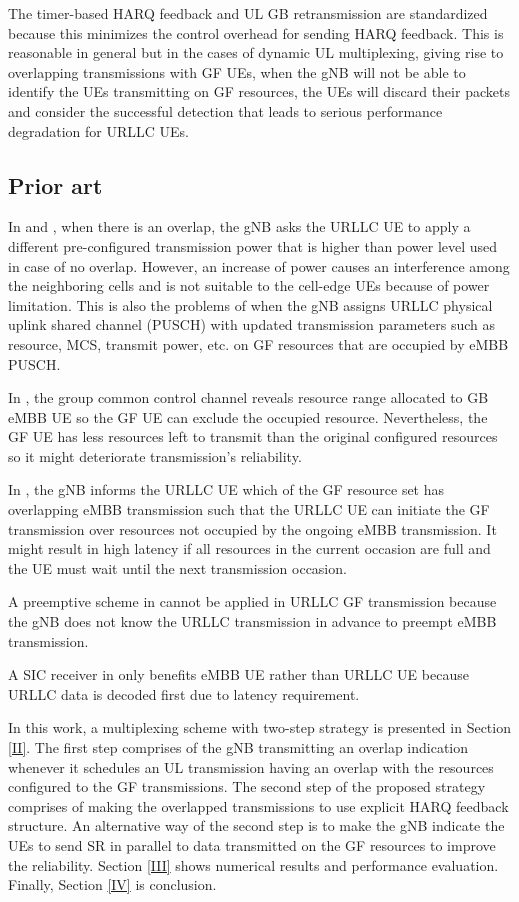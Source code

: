 \documentclass[conference]{IEEEtran}
\begin{document}
The timer-based HARQ feedback and UL GB retransmission are standardized because this minimizes the control overhead for sending HARQ feedback. This is reasonable in general but in the cases of dynamic UL multiplexing, giving rise to overlapping transmissions with GF UEs, when the gNB will not be able to identify the UEs transmitting on GF resources, the UEs will discard their packets and consider the successful detection that leads to serious performance degradation for URLLC UEs.

\subsection{Prior art}\label{ICC}
In \cite{b2} and \cite{b3}, when there is an overlap, the gNB asks the URLLC UE to apply a different pre-configured transmission power that is higher than power level used in case of no overlap. However, an increase of power causes an interference among the neighboring cells and is not suitable to the cell-edge UEs because of power limitation. This is also the problems of \cite{b5} when the gNB assigns URLLC physical uplink shared channel (PUSCH) with updated transmission parameters such as resource, MCS, transmit power, etc. on GF resources that are occupied by eMBB PUSCH. 

In \cite{b7}, the group common control channel reveals resource range allocated to GB eMBB UE so the GF UE can exclude the occupied resource. Nevertheless, the GF UE has less resources left to transmit than the original configured resources so it might deteriorate transmission's reliability.

In \cite{b9}, the gNB informs the URLLC UE which of the GF resource set has overlapping eMBB transmission such that the URLLC UE can initiate the GF transmission over resources not occupied by the ongoing eMBB transmission. It might result in high latency if all resources in the current occasion are full and the UE must wait until the next transmission occasion.

A preemptive scheme in \cite{b10} cannot be applied in URLLC GF transmission because the gNB does not know the URLLC transmission in advance to preempt eMBB transmission.

A SIC receiver in \cite{b11} only benefits eMBB UE rather than URLLC UE because URLLC data is decoded first due to latency requirement.

In this work, a multiplexing scheme with two-step strategy is presented in Section \ref{II}. The first step comprises of the gNB transmitting an overlap indication whenever it schedules an UL transmission having an overlap with the resources configured to the GF transmissions. The second step of the proposed strategy comprises of making the overlapped transmissions to use explicit HARQ feedback structure. An alternative way of the second step is to make the gNB indicate the UEs to send SR in parallel to data transmitted on the GF resources to improve the reliability. Section \ref{III} shows numerical results and performance evaluation. Finally, Section \ref{IV} is conclusion.
\end{document}
